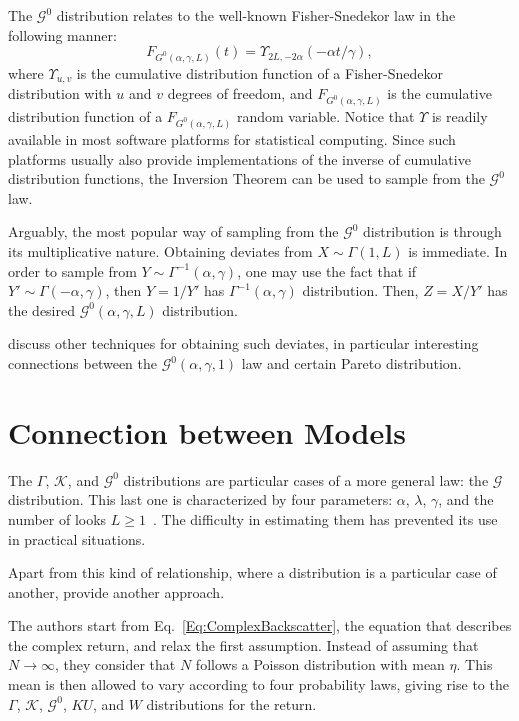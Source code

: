 The $\mathcal G^0$ distribution relates to the well-known Fisher-Snedekor law in the following manner:
\begin{equation}
F_{G^0(\alpha,\gamma,L)}(t) = \Upsilon_{2L,- 2\alpha}(- \alpha t/\gamma),
\end{equation}
where $\Upsilon_{u,v}$ is the cumulative distribution function of a Fisher-Snedekor distribution with $u$ and $v$ degrees of freedom, and $F_{G^0(\alpha,\gamma,L)}$ is the cumulative distribution function of a $F_{G^0(\alpha,\gamma,L)}$ random variable.
Notice that $\Upsilon$ is readily available in most software platforms for statistical computing.
Since such platforms usually also provide implementations of the inverse of cumulative distribution functions, the Inversion Theorem can be used to sample from the $\mathcal G^0$ law.

Arguably, the most popular way of sampling from the $\mathcal G^0$ distribution is through its multiplicative nature.
Obtaining deviates from $X\sim\Gamma(1,L)$ is immediate.
In order to sample from $Y\sim\Gamma^{-1}(\alpha,\gamma)$, one may use the fact that if $Y'\sim\Gamma(-\alpha,\gamma)$, then $Y=1/Y'$ has $\Gamma^{-1}(\alpha,\gamma)$ distribution.
Then, $Z=X/Y'$ has the desired $\mathcal G^0(\alpha,\gamma,L)$ distribution.

\citet{SamplingfromtheGI0Distribution2018} discuss other techniques for obtaining such deviates, in particular interesting connections between the $\mathcal G^0(\alpha,\gamma,1)$ law and certain Pareto distribution.

\section{Connection between Models}

The $\Gamma$, $\mathcal K$, and $\mathcal G^0$ distributions are particular cases of a more general law: the $\mathcal G$ distribution.
This last one is characterized by four parameters: $\alpha$, $\lambda$, $\gamma$, and the number of looks $L\geq1$~\citep{frery96}.
The difficulty in estimating them has prevented its use in practical situations.

Apart from this kind of relationship, where a distribution is a particular case of another, \citet{DelignonPieczynski:02} provide another approach.

The authors start from Eq.~\eqref{Eq:ComplexBackscatter}, the equation that describes the complex return, and relax the first assumption.
Instead of assuming that $N\to\infty$, they consider that $N$ follows a Poisson distribution with mean $\eta$.
This mean is then allowed to vary according to four probability laws, giving rise to the $\Gamma$, $\mathcal K$, $\mathcal G^0$, $KU$, and $W$ distributions for the return.

